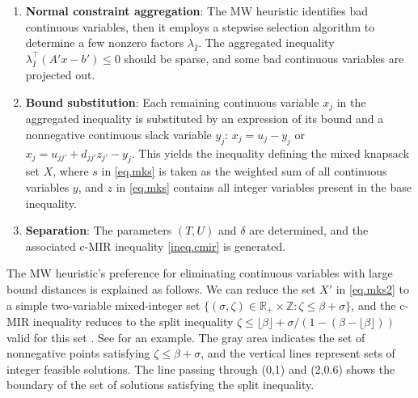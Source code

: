 \documentclass[a4paper,UKenglish,cleveref, autoref,  thm-restate]{lipics-v2021}
\newcommand{\bR}{\mathbb{R}}
\newcommand{\bZ}{\mathbb{Z}}
\newcommand{\floor}[1]{\lfloor #1 \rfloor}
\begin{document}
	\begin{enumerate}
		\item \textbf{Normal constraint aggregation}:  The MW heuristic identifies bad continuous variables, then it employs a stepwise selection algorithm to determine a few nonzero factors $\lambda_{\bar{I}}$. The aggregated inequality $\lambda_{\bar{I}}^\top(A'x - b') \le 0$ should be sparse, and some bad continuous variables are projected out.
		\item \textbf{Bound substitution}: %
		Each remaining continuous variable $x_j$ in the aggregated inequality is substituted by an expression of its bound and a nonnegative continuous slack variable $y_j$: $x_j = u_j - y_j$ or $x_j = u_{jj'} + d_{jj'} z_{j'} - y_j$. %
		This yields the inequality defining the mixed knapsack set $X$, where $s$ in \eqref{eq.mks} is taken as the weighted sum of all %
		continuous variables $y$, and $z$ in \eqref{eq.mks} contains all integer variables present in the base inequality.
		\item \textbf{Separation}: The parameters  \( (T,U) \) and \( \delta \) are determined, and the associated c-MIR inequality \eqref{ineq.cmir} is generated. 
	\end{enumerate}
	
	
	The MW heuristic's preference for eliminating continuous variables with large bound distances is explained as follows.
	We can reduce the set $X'$ in \eqref{eq.mks2}  to a simple two-variable mixed-integer set $\{(\sigma,\zeta) \in \bR_+ \times \bZ: \zeta \le \beta + \sigma \}$, and the c-MIR inequality reduces to the split inequality $\zeta  \le \floor{\beta} + \sigma/(1- (\beta - \floor{\beta})) $ valid for this set \cite{cornuejols2008valid,marchand2001aggregation}. See  for an example. The gray area indicates the set of nonnegative points satisfying $\zeta \le \beta + \sigma$, and the vertical lines represent sets of integer feasible solutions. The line passing through (0,1) and (2,0.6) shows the boundary of the set of solutions satisfying the split inequality.
	
\end{document}
